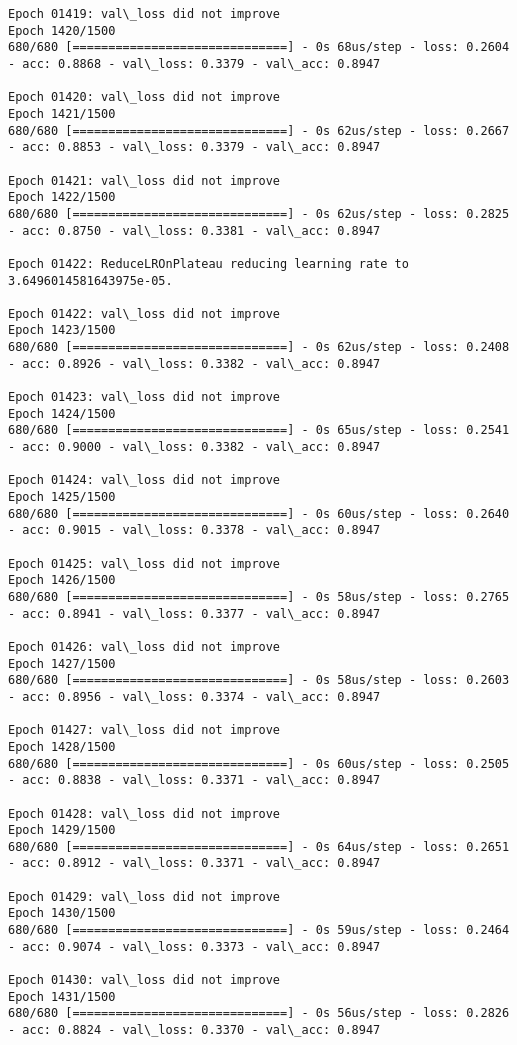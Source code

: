 \documentclass[11pt]{article}
\begin{document}
\begin{Verbatim}[commandchars=\\\{\}]
Epoch 01419: val\_loss did not improve
Epoch 1420/1500
680/680 [==============================] - 0s 68us/step - loss: 0.2604 - acc: 0.8868 - val\_loss: 0.3379 - val\_acc: 0.8947

Epoch 01420: val\_loss did not improve
Epoch 1421/1500
680/680 [==============================] - 0s 62us/step - loss: 0.2667 - acc: 0.8853 - val\_loss: 0.3379 - val\_acc: 0.8947

Epoch 01421: val\_loss did not improve
Epoch 1422/1500
680/680 [==============================] - 0s 62us/step - loss: 0.2825 - acc: 0.8750 - val\_loss: 0.3381 - val\_acc: 0.8947

Epoch 01422: ReduceLROnPlateau reducing learning rate to 3.6496014581643975e-05.

Epoch 01422: val\_loss did not improve
Epoch 1423/1500
680/680 [==============================] - 0s 62us/step - loss: 0.2408 - acc: 0.8926 - val\_loss: 0.3382 - val\_acc: 0.8947

Epoch 01423: val\_loss did not improve
Epoch 1424/1500
680/680 [==============================] - 0s 65us/step - loss: 0.2541 - acc: 0.9000 - val\_loss: 0.3382 - val\_acc: 0.8947

Epoch 01424: val\_loss did not improve
Epoch 1425/1500
680/680 [==============================] - 0s 60us/step - loss: 0.2640 - acc: 0.9015 - val\_loss: 0.3378 - val\_acc: 0.8947

Epoch 01425: val\_loss did not improve
Epoch 1426/1500
680/680 [==============================] - 0s 58us/step - loss: 0.2765 - acc: 0.8941 - val\_loss: 0.3377 - val\_acc: 0.8947

Epoch 01426: val\_loss did not improve
Epoch 1427/1500
680/680 [==============================] - 0s 58us/step - loss: 0.2603 - acc: 0.8956 - val\_loss: 0.3374 - val\_acc: 0.8947

Epoch 01427: val\_loss did not improve
Epoch 1428/1500
680/680 [==============================] - 0s 60us/step - loss: 0.2505 - acc: 0.8838 - val\_loss: 0.3371 - val\_acc: 0.8947

Epoch 01428: val\_loss did not improve
Epoch 1429/1500
680/680 [==============================] - 0s 64us/step - loss: 0.2651 - acc: 0.8912 - val\_loss: 0.3371 - val\_acc: 0.8947

Epoch 01429: val\_loss did not improve
Epoch 1430/1500
680/680 [==============================] - 0s 59us/step - loss: 0.2464 - acc: 0.9074 - val\_loss: 0.3373 - val\_acc: 0.8947

Epoch 01430: val\_loss did not improve
Epoch 1431/1500
680/680 [==============================] - 0s 56us/step - loss: 0.2826 - acc: 0.8824 - val\_loss: 0.3370 - val\_acc: 0.8947


\end{Verbatim}
\end{document}
